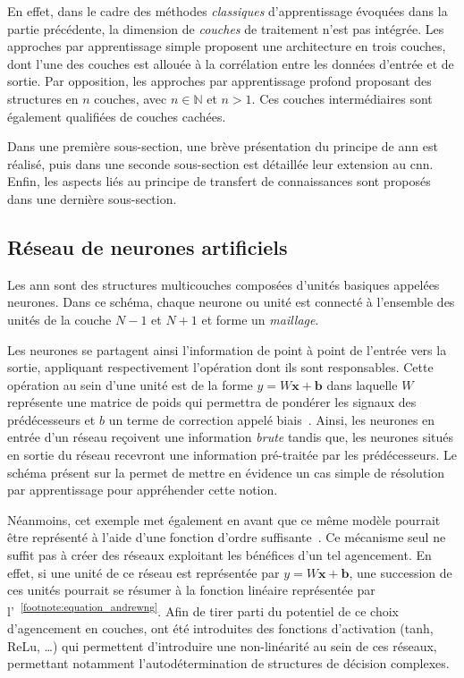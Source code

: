 En effet, dans le cadre des méthodes \textit{classiques} d’apprentissage évoquées dans la partie précédente, la dimension de \textit{couches} de traitement n’est pas intégrée. Les approches par apprentissage simple proposent une architecture en trois couches, dont l’une des couches est allouée à la corrélation entre les données d’entrée et de sortie. Par opposition, les approches par apprentissage profond proposant des structures en $n$ couches, avec $n \in \pmb{\mathbb{N}}$ et $n>1$. Ces couches intermédiaires sont également qualifiées de couches cachées.\par 

Dans une première sous-section, une brève présentation du principe de \gls{ann} est réalisé, puis dans une seconde sous-section est détaillée leur extension au \gls{cnn}. Enfin, les aspects liés au principe de transfert de connaissances sont proposés dans une dernière sous-section.\par

\subsection{Réseau de neurones artificiels}
Les \gls{ann} sont des structures multicouches composées d'unités basiques appelées neurones. Dans ce schéma, chaque neurone ou unité est connecté à l'ensemble des unités de la couche $N-1$ et $N+1$ et forme un \textit{maillage}.\par

Les neurones se partagent ainsi l'information de point à point de l'entrée vers la sortie, appliquant respectivement l'opération dont ils sont responsables. Cette opération au sein d'une unité est de la forme $y = W\mathbf{x}+\mathbf{b}$ dans laquelle $W$ représente une matrice de poids qui permettra de pondérer les signaux des prédécesseurs et $b$ un terme de correction appelé biais~\cite{Stephen1990}. Ainsi, les neurones en entrée d'un réseau reçoivent une information \textit{brute} tandis que, les neurones situés en sortie du réseau recevront une information pré-traitée par les prédécesseurs. Le schéma présent sur la  permet de mettre en évidence un cas simple de résolution par apprentissage pour appréhender cette notion.\par

Néanmoins, cet exemple met également en avant que ce même modèle pourrait être représenté à l'aide d'une fonction d'ordre suffisante~\cite{Bishop2006}. Ce mécanisme seul ne suffit pas à créer des réseaux exploitant les bénéfices d'un tel agencement. En effet, si une unité de ce réseau est représentée par $y = W\mathbf{x}+\mathbf{b}$, une succession de ces unités pourrait se résumer à la fonction linéaire représentée par l'~\textsuperscript{\ref{footnote:equation_andrewng}}. Afin de tirer parti du potentiel de ce choix d'agencement en couches, ont été introduites des fonctions d'activation (tanh, ReLu, \ldots) qui permettent d'introduire une non-linéarité au sein de ces réseaux, permettant notamment l’autodétermination de structures de décision complexes.\par

